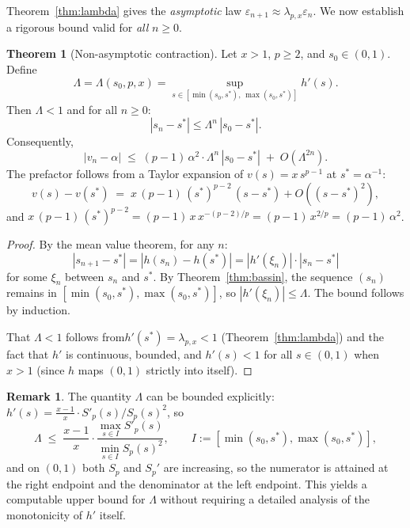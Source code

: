 \documentclass[11pt,a4paper]{article}
\theoremstyle{definition}
\newtheorem{theorem}{Theorem}[section]
\newtheorem{remark}{Remark}[section]
\newcommand{\eps}{\varepsilon}
\begin{document}
Theorem~\ref{thm:lambda} gives the \emph{asymptotic} law $\eps_{n+1} \approx \lambda_{p,x} \eps_n$. We now establish a rigorous bound valid for \emph{all} $n \geq 0$.

\begin{theorem}[Non-asymptotic contraction]
\label{thm:nonasymp}
Let $x > 1$, $p \geq 2$, and $s_0 \in (0,1)$. Define
\[
  \Lambda = \Lambda(s_0, p, x) = \sup_{s \in [\min(s_0, s^*),\, \max(s_0, s^*)]} h'(s).
\]
Then $\Lambda < 1$ and for all $n \geq 0$:
\begin{equation}
  \label{eq:nonasymp_bound}
  |s_n - s^*| \leq \Lambda^n \, |s_0 - s^*|.
\end{equation}
Consequently,
\[
  |v_n - \alpha| \;\leq\; (p-1)\,\alpha^2 \cdot \Lambda^n\, |s_0 - s^*| \;+\; O(\Lambda^{2n}).
\]
The prefactor follows from a Taylor expansion of $v(s) = x\, s^{p-1}$ at $s^* = \alpha^{-1}$:
\[
  v(s) - v(s^*) \;=\; x\,(p-1)\,(s^*)^{p-2}\,(s - s^*) + O((s - s^*)^2),
\]
and $x\,(p-1)\,(s^*)^{p-2} = (p-1)\, x\, x^{-(p-2)/p} = (p-1)\, x^{2/p} = (p-1)\,\alpha^2$.
\end{theorem}

\begin{proof}
By the mean value theorem, for any $n$:
\[
  |s_{n+1} - s^*| = |h(s_n) - h(s^*)| = |h'(\xi_n)| \cdot |s_n - s^*|
\]
for some $\xi_n$ between $s_n$ and $s^*$. By Theorem~\ref{thm:bassin}, the sequence $(s_n)$ remains in $[\min(s_0,s^*), \max(s_0,s^*)]$, so $|h'(\xi_n)| \leq \Lambda$. The bound follows by induction.

That $\Lambda < 1$ follows from$h'(s^*) = \lambda_{p,x} < 1$ (Theorem~\ref{thm:lambda}) and the fact that $h'$ is continuous, bounded, and $h'(s) < 1$ for all $s \in (0,1)$ when $x > 1$ (since $h$ maps $(0,1)$ strictly into itself).
\end{proof}

\begin{remark}
The quantity $\Lambda$ can be bounded explicitly: $h'(s) = \tfrac{x-1}{x} \cdot S'_p(s)/S_p(s)^2$, so
\[
  \Lambda \;\leq\; \frac{x-1}{x} \cdot \frac{\max_{s \in I} S'_p(s)}{\min_{s \in I} S_p(s)^2},
  \qquad I := [\min(s_0, s^*), \max(s_0, s^*)],
\]
and on $(0,1)$ both $S_p$ and $S_p'$ are increasing, so the numerator is attained at the right endpoint and the denominator at the left endpoint. This yields a computable upper bound for $\Lambda$ without requiring a detailed analysis of the monotonicity of $h'$ itself.
\end{remark}
\end{document}
